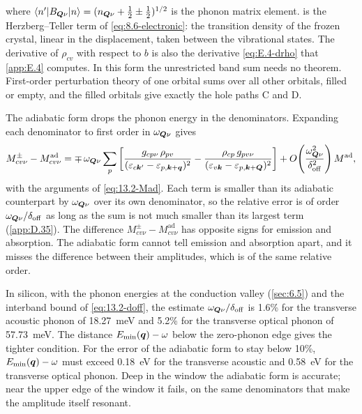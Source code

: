 where $\langle n'|B_{\bm{Q}\nu}|n\rangle = (n_{\bm{Q}\nu} + \frac12 \pm \frac12)^{1/2}$ is the phonon matrix element.  is the Herzberg--Teller term of \cref{eq:8.6-electronic}: the transition density of the frozen crystal, linear in the displacement, taken between the vibrational states. The derivative of $\rho_{cv}$ with respect to $b$ is also the derivative \cref{eq:E.4-drho} that \cref{app:E.4} computes. In this form the unrestricted band sum needs no theorem. First-order perturbation theory of one orbital sums over all other orbitals, filled or empty, and the filled orbitals give exactly the hole paths C and D.

The adiabatic form drops the phonon energy in the denominators. Expanding each denominator to first order in $\omega_{\bm{Q}\nu}$ gives
\begin{equation}
  M^{\pm}_{cv\nu} - M^{\mathrm{ad}}_{cv\nu} = \mp\,\omega_{\bm{Q}\nu}\sum_p\left[\frac{g_{cp\nu}\,\rho_{pv}}{(\varepsilon_{c\bm{k}'} - \varepsilon_{p,\bm{k}+\bm{q}})^2} - \frac{\rho_{cp}\,g_{pv\nu}}{(\varepsilon_{v\bm{k}} - \varepsilon_{p,\bm{k}+\bm{Q}})^2}\right] + O\!\left(\frac{\omega_{\bm{Q}\nu}^2}{\delta_{\mathrm{off}}^2}\right)M^{\mathrm{ad}} ,
  \label{eq:13.2-err}
\end{equation}
with the arguments of \cref{eq:13.2-Mad}. Each term is smaller than its adiabatic counterpart by $\omega_{\bm{Q}\nu}$ over its own denominator, so the relative error is of order $\omega_{\bm{Q}\nu}/\delta_{\mathrm{off}}$ as long as the sum is not much smaller than its largest term (\cref{app:D.35}). The difference $M^{\pm}_{cv\nu} - M^{\mathrm{ad}}_{cv\nu}$ has opposite signs for emission and absorption. The adiabatic form cannot tell emission and absorption apart, and it misses the difference between their amplitudes, which is of the same relative order.

In silicon, with the phonon energies at the conduction valley (\cref{sec:6.5}) and the interband bound of \cref{eq:13.2-doff}, the estimate $\omega_{\bm{Q}\nu}/\delta_{\mathrm{off}}$ is 1.6\% for the transverse acoustic phonon of \SI{18.27}{meV} and 5.2\% for the transverse optical phonon of \SI{57.73}{meV}. The distance $E_{\mathrm{min}}(\bm{q}) - \omega$ below the zero-phonon edge gives the tighter condition. For the error of the adiabatic form to stay below 10\%, $E_{\mathrm{min}}(\bm{q}) - \omega$ must exceed \SI{0.18}{eV} for the transverse acoustic and \SI{0.58}{eV} for the transverse optical phonon. Deep in the window the adiabatic form is accurate; near the upper edge of the window it fails, on the same denominators that make the amplitude itself resonant.

